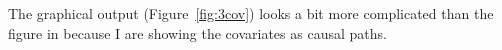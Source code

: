 \documentclass[11pt]{article}
\begin{document}
The graphical output  (Figure~\ref{fig:3cov}) looks a bit more complicated than the figure in \cite[p 177]{hayes:13} because I are showing the covariates as causal paths.  
%
%
%
%
%
%
%
%
%
\end{document}
